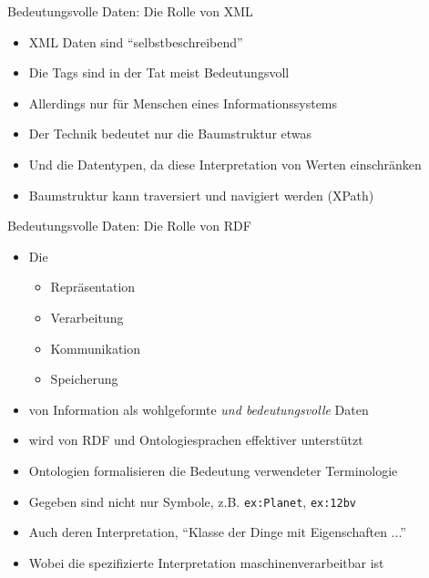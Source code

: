 \documentclass{beamer}
\begin{document}
\begin{frame}{Bedeutungsvolle Daten: Die Rolle von XML}
	
	\begin{itemize}
		\item XML Daten sind ``selbstbeschreibend''
		\item Die Tags sind in der Tat meist Bedeutungsvoll
		\item Allerdings nur für Menschen eines Informationssystems
		\item Der Technik bedeutet nur die Baumstruktur etwas
		\item Und die Datentypen, da diese Interpretation von Werten einschränken
		\item Baumstruktur kann traversiert und navigiert werden (XPath)
	\end{itemize}
	
\end{frame}

\begin{frame}{Bedeutungsvolle Daten: Die Rolle von RDF}
	
	\begin{itemize}
		\item Die
		\begin{itemize}
			\item Repräsentation
			\item Verarbeitung
			\item Kommunikation
			\item Speicherung
		\end{itemize}
		\item von Information als wohlgeformte \emph{und bedeutungsvolle} Daten
		\item wird von RDF und Ontologiesprachen effektiver unterstützt
		\item Ontologien formalisieren die Bedeutung verwendeter Terminologie
		\item Gegeben sind nicht nur Symbole, z.B. \texttt{ex:Planet}, \texttt{ex:12bv}
		\item Auch deren Interpretation, ``Klasse der Dinge mit Eigenschaften ...''
		\item Wobei die spezifizierte Interpretation maschinenverarbeitbar ist
	\end{itemize}
	
\end{frame}
\end{document}
